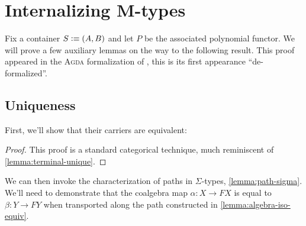 \documentclass[12pt,twoside]{reedthesis}
\let\oldindex\index
\renewcommand{\index}[1]
               {\oldindex{#1}\marginpar{\footnotesize\color{index}index: #1}}
\newcommand{\indeX}{\oldindex}
\newcommand{\indeX}{\index}
\newcommand{\TODO}[1]{\marginpar{\footnotesize\color{TODO}todo: #1}}
\newcommand{\software}[1]{{\textsc{#1}}\indeX{#1}}
\newcommand{\Agda}{\software{Agda}}
\newcommand{\unimathname}[1]{\texttt{\footnotesize\color{accepted} #1}}
\newcommand{\Coalgtype}{\ensuremath{\ttfun{Coalg}}}
\newcommand{\Final}{\ensuremath{\ttfun{Final}}}
\begin{document}
\section{Internalizing M-types}
\label{sec:internalizing-m-types}

Fix a container $S\vcentcolon\equiv (A,B)$ and let $P$ be the associated polynomial functor.
We will prove a few auxiliary lemmas on the way to the following result.
This proof appeared in the \Agda{} formalization of \cite{non-wellfounded}, this
is its first appearance ``de-formalized''.

\subsection{Uniqueness}
\label{subsec:uniqueness}


First, we'll show that their carriers are equivalent:

\begin{proof}
  This proof is a standard categorical technique, much reminiscent of
  \cref{lemma:terminal-unique}.
	\TODO{proof}
\end{proof}

We can then invoke the characterization of paths in $Σ$-types,
\cref{lemma:path-sigma}. We'll need to demonstrate that the coalgebra map
$α:X\to FX$ is equal to $β:Y\to FY$ when transported along the path
constructed in \cref{lemma:algebra-iso-equiv}.
\end{document}
